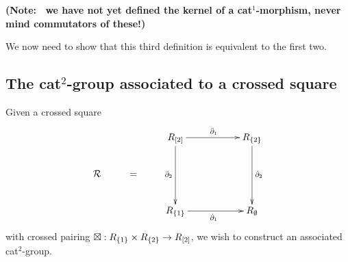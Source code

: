 \noindent
{\bf (Note:~ we have not yet defined the kernel of a cat$^1$-morphism, 
never mind commutators of these!)} 

\medskip
We now need to show that this third definition is equivalent to the first two. 


\newpage
\subsection{The cat$^2$-group associated to a crossed square} 
\label{sect:cat2-xsq}


Given a crossed square
\begin{equation} \label{eq:RsquareR}
\vcenter{\xymatrix{
        &   &    R_{[2]} \ar[rr]^{\ddbdyo} \ar[dd]_{\ddbdyt}
             &&  R_{\{2\}} \ar[dd]^{\dbdyt} \\
  \calR & = &&&  \\
        &   &    R_{\{1\}} \ar[rr]_{\dbdyo}
             &&  R_{\emptyset}
}}
\end{equation}
with crossed pairing $\boxtimes: R_{\{1\}} \times R_{\{2\}} \to R_{[2]}$, 
we wish to construct an associated cat$^2$-group.

